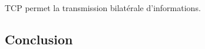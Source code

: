 \Gls{TCP} permet la transmission bilatérale d’informations.

\subsubsection{}
\label{sec:sctp}

\subsubsection{}
\label{sec:udp}

\subsubsection{}
\label{sec:ssh}

\subsubsection{}
\label{sec:ftp}

\subsection{Conclusion}
\label{sec:comparaisonProtocoleCommnunicationConclusion}
